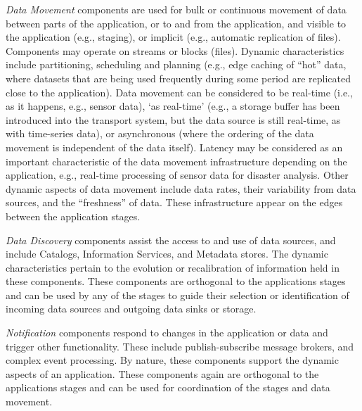 {\em Data Movement} components are used for bulk or continuous
movement of data between parts of the application, or to and from the
application, %
and visible to the application (e.g., staging), or implicit (e.g.,
automatic replication of files). Components may operate on streams or
blocks (files). Dynamic characteristics include partitioning,
scheduling and planning (e.g., edge caching of ``hot'' data, where
datasets that are being used frequently during some period are
replicated close to the application). Data movement can be considered
to be real-time (i.e., as it happens, e.g., sensor data), `as real-time'
(e.g., a storage buffer has been introduced into the transport system,
but the data source is still real-time, as with time-series data), or
asynchronous (where the ordering of the data movement is independent
of the data itself).  Latency may be considered as an important
characteristic of the data movement infrastructure depending on the
application, e.g., real-time processing of sensor data for disaster
analysis. Other dynamic aspects of data movement include data rates,
their variability from data sources, and the ``freshness'' of
data. These infrastructure appear on the edges between the application
stages.

{\em Data Discovery} components assist the access to and use of data
sources, and include Catalogs, Information Services, and Metadata
stores. The dynamic characteristics pertain to the evolution or
recalibration of information held in these components. These components are orthogonal to the
applications stages and can be used by any of the
stages to guide their selection or identification of incoming data sources and outgoing data sinks
or storage.

{\em Notification} components respond to changes in the application or
data and trigger other functionality. These include publish-subscribe message brokers,
and complex event processing. By nature, these components support the dynamic aspects of an application.  These components again are orthogonal to the applications stages and can be used for coordination of the stages and data movement.

